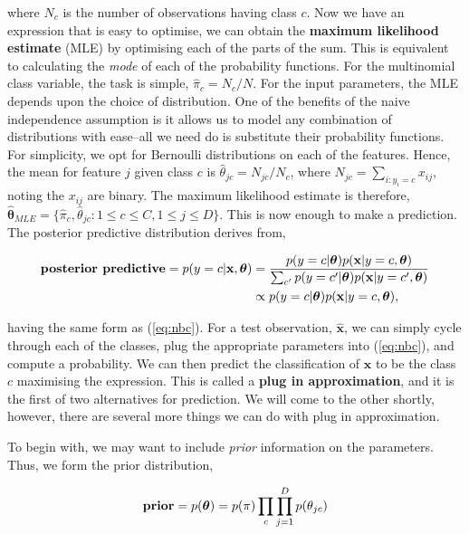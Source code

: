 \documentclass[11pt]{amsart}
\begin{document}
where $N_c$ is the number of observations having class $c$. Now we have an expression that is easy to optimise, we can obtain the \textbf{maximum likelihood estimate} (MLE) by optimising each of the parts of the sum. This is equivalent to calculating the \emph{mode} of each of the probability functions. For the multinomial class variable, the task is simple, $\hat\pi_c = N_c/N.$ For the input parameters, the MLE depends upon the choice of distribution. One of the benefits of the naive independence assumption is it allows us to model any combination of distributions with ease--all we need do is substitute their probability functions. For simplicity, we opt for Bernoulli distributions on each of the features. Hence, the mean for feature $j$ given class $c$ is $\hat\theta_{jc} = N_{jc}/N_c$, where $N_{jc} = \sum_{i:y_i=c} x_{ij}$, noting the $x_{ij}$ are binary. The maximum likelihood estimate is therefore, $\hat{\boldsymbol\theta}_{MLE} = \{\hat\pi_c, \hat\theta_{jc} : 1\leq c\leq C, 1\leq j\leq D\}$. This is now enough to make a prediction. The posterior predictive distribution derives from,

\begin{align}
\textbf{posterior predictive} = p(y = c|\mathbf{x},\boldsymbol\theta) 
&= \frac{p(y = c|\boldsymbol\theta)p(\mathbf{x}|y=c,\boldsymbol\theta)}{\sum_{c'}p(y = c'|\boldsymbol\theta)p(\mathbf{x}|y=c',\boldsymbol\theta)} \notag \\
&\propto p(y = c|\boldsymbol\theta)p(\mathbf{x}|y=c,\boldsymbol\theta), \notag
\end{align}

having the same form as (\ref{eq:nbc}). For a test observation, $\hat{\mathbf{x}}$, we can simply cycle through each of the classes, plug the appropriate parameters into (\ref{eq:nbc}), and compute a probability. We can then predict the classification of $\mathbf{x}$ to be the class $c$ maximising the expression. This is called a \textbf{plug in approximation}, and it is the first of two alternatives for prediction. We will come to the other shortly, however, there are several more things we can do with plug in approximation.

To begin with, we may want to include \emph{prior} information on the parameters. Thus, we form the prior distribution,

\begin{align}
\textbf{prior} = p(\boldsymbol\theta) = p(\pi)\prod_c\prod_{j=1}^Dp(\theta_{jc}) \notag
\end{align}
\end{document}
